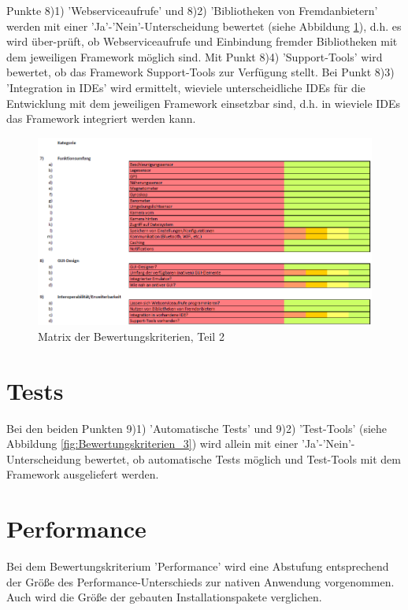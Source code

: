 Punkte 8)1) 'Webserviceaufrufe' und 8)2) 'Bibliotheken von Fremdanbietern' werden mit einer 'Ja'-'Nein'-Unterscheidung bewertet (siehe Abbildung \ref{fig:Bewertungskriterien_2}), d.h. es wird über-prüft, ob Webserviceaufrufe und Einbindung fremder Bibliotheken mit dem jeweiligen Framework möglich sind. Mit Punkt 8)4) 'Support-Tools' wird bewertet, ob das Framework Support-Tools zur Verfügung stellt. Bei Punkt 8)3) 'Integration in IDEs' wird ermittelt, wieviele unterscheidliche IDEs für die Entwicklung mit dem jeweiligen Framework einsetzbar sind, d.h. in wieviele IDEs das Framework integriert werden kann. 
\clearpage

\begin{figure}[h]
	\centering
	\includegraphics[width=1\textwidth]{Bilder/Bewertungsmatrix_2.PNG}
	\caption{Matrix der Bewertungskriterien, Teil 2}
	\label{fig:Bewertungskriterien_2}
\end{figure}

\section{Tests}

Bei den beiden Punkten 9)1) 'Automatische Tests' und 9)2) 'Test-Tools' (siehe Abbildung \ref{fig:Bewertungskriterien_3}) wird allein mit einer 'Ja'-'Nein'-Unterscheidung bewertet, ob automatische Tests möglich und Test-Tools mit dem Framework ausgeliefert werden. 

\section{Performance}

Bei dem Bewertungskriterium 'Performance' wird eine Abstufung entsprechend der Größe des Performance-Unterschieds zur nativen Anwendung vorgenommen. Auch wird die Größe der gebauten Installationspakete verglichen. 

